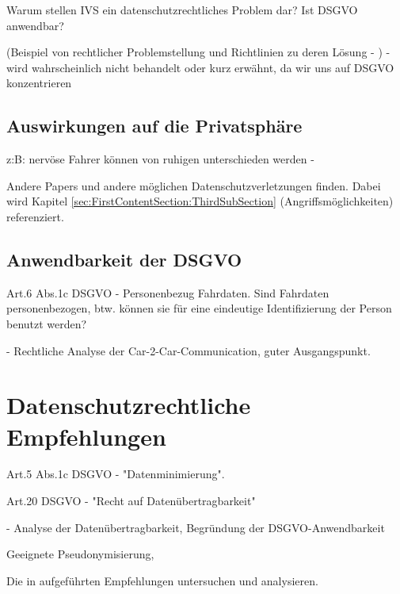 Warum stellen IVS ein datenschutzrechtliches Problem dar? Ist DSGVO anwendbar? 

(Beispiel von rechtlicher Problemstellung und Richtlinien zu deren Lösung - \cite{EUCooperativeV2X} ) - wird wahrscheinlich nicht behandelt oder kurz erwähnt, da wir uns auf DSGVO konzentrieren


\subsection{Auswirkungen auf die Privatsphäre}
\label{sec:SecondContentSection:FirstSubsection}

z:B: nervöse Fahrer können von ruhigen unterschieden werden - \cite{Dettki2005}

Andere Papers und andere möglichen Datenschutzverletzungen finden. Dabei wird Kapitel  \ref{sec:FirstContentSection:ThirdSubSection} (Angriffsmöglichkeiten) referenziert.

\subsection{Anwendbarkeit der DSGVO}
\label{sec:SecondContentSection:SecondSubsection}

Art.6 Abs.1c DSGVO - Personenbezug Fahrdaten. Sind Fahrdaten personenbezogen, btw. können sie für eine eindeutige Identifizierung der Person benutzt werden?

\cite{Weichert2016} - Rechtliche Analyse der Car-2-Car-Communication, guter Ausgangspunkt.

\section{Datenschutzrechtliche Empfehlungen}
\label{ch:ThirdContentSection}

Art.5 Abs.1c DSGVO - "Datenminimierung". 

Art.20 DSGVO - "Recht auf Datenübertragbarkeit"

\cite{Straub2018} - Analyse der Datenübertragbarkeit, Begründung der DSGVO-Anwendbarkeit

Geeignete Pseudonymisierung, 

Die in \cite{Kiometzis2017} aufgeführten Empfehlungen untersuchen und analysieren. 

